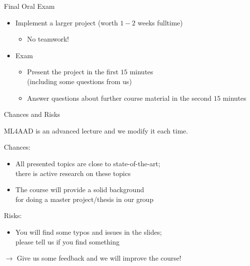 \begin{frame}[c]{Final Oral Exam}

\begin{itemize}
  \item Implement a larger project (worth $1-2$ weeks fulltime)
	\begin{itemize}
		\item No teamwork!
	\end{itemize}
  \item Exam
	\begin{itemize}
		\item Present the project in the first $15$ minutes\\ (including some questions from us)
		\item Answer questions about further course material in the second $15$ minutes
	\end{itemize}	
\end{itemize}

\end{frame}
\begin{frame}[c]{Chances and Risks}

ML4AAD is an advanced lecture and we modify it each time.

\bigskip
\pause

Chances:
\begin{itemize}
  \item All presented topics are close to state-of-the-art;\\there is active research on these topics  
  \item The course will provide a solid background\\ for doing a master project/thesis in our group 
\end{itemize}

\medskip

Risks:
\begin{itemize}
  \item You will find some typos and issues in the slides;\\ please tell us if you find something
\end{itemize}

\medskip
\pause
$\to$ Give us some feedback and we will improve the course!

\end{frame}
